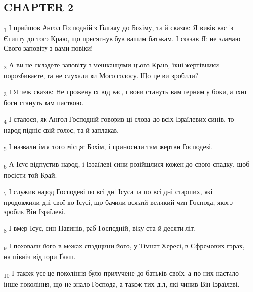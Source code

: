 \subsection{CHAPTER 2}
\begin{tcolorbox}
\textsubscript{1} І прийшов Ангол Господній з Ґілґалу до Бохіму, та й сказав: Я вивів вас із Єгипту до того Краю, що присягнув був вашим батькам. І сказав Я: не зламаю Свого заповіту з вами повіки!
\end{tcolorbox}
\begin{tcolorbox}
\textsubscript{2} А ви не складете заповіту з мешканцями цього Краю, їхні жертівники порозбиваєте, та не слухали ви Мого голосу. Що це ви зробили?
\end{tcolorbox}
\begin{tcolorbox}
\textsubscript{3} І Я теж сказав: Не прожену їх від вас, і вони стануть вам терням у боки, а їхні боги стануть вам пасткою.
\end{tcolorbox}
\begin{tcolorbox}
\textsubscript{4} І сталося, як Ангол Господній говорив ці слова до всіх Ізраїлевих синів, то народ підніс свій голос, та й заплакав.
\end{tcolorbox}
\begin{tcolorbox}
\textsubscript{5} І назвали ім'я того місця: Бохім, і приносили там жертви Господеві.
\end{tcolorbox}
\begin{tcolorbox}
\textsubscript{6} А Ісус відпустив народ, і Ізраїлеві сини розійшлися кожен до свого спадку, щоб посісти той Край.
\end{tcolorbox}
\begin{tcolorbox}
\textsubscript{7} І служив народ Господеві по всі дні Ісуса та по всі дні старших, які продовжили дні свої по Ісусі, що бачили всякий великий чин Господа, якого зробив Він Ізраїлеві.
\end{tcolorbox}
\begin{tcolorbox}
\textsubscript{8} І вмер Ісус, син Навинів, раб Господній, віку ста й десяти літ.
\end{tcolorbox}
\begin{tcolorbox}
\textsubscript{9} І поховали його в межах спадщини його, у Тімнат-Хересі, в Єфремових горах, на північ від гори Ґааш.
\end{tcolorbox}
\begin{tcolorbox}
\textsubscript{10} І також усе це покоління було прилучене до батьків своїх, а по них настало інше покоління, що не знало Господа, а також тих діл, які чинив Він Ізраїлеві.
\end{tcolorbox}
